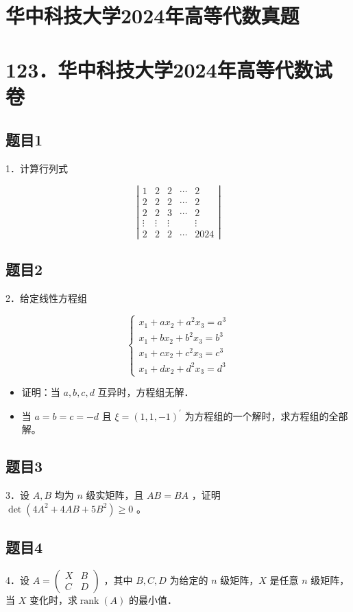 \documentclass{article}
\begin{document}
\section*{华中科技大学2024年高等代数真题}
\section*{123．华中科技大学2024年高等代数试卷}

\subsection{题目1}
1．计算行列式

\[
\left|\begin{array}{ccccc}
1 & 2 & 2 & \cdots & 2 \\
2 & 2 & 2 & \cdots & 2 \\
2 & 2 & 3 & \cdots & 2 \\
\vdots & \vdots & \vdots & & \vdots \\
2 & 2 & 2 & \cdots & 2024
\end{array}\right|
\]

\subsection{题目2}
2．给定线性方程组

\[
\left\{\begin{array}{l}
x_{1}+a x_{2}+a^{2} x_{3}=a^{3} \\
x_{1}+b x_{2}+b^{2} x_{3}=b^{3} \\
x_{1}+c x_{2}+c^{2} x_{3}=c^{3} \\
x_{1}+d x_{2}+d^{2} x_{3}=d^{3}
\end{array}\right.
\]

\begin{itemize}
  \item[（1）] 证明：当 \(a, b, c, d\) 互异时，方程组无解．
  \item[（2）] 当 \(a=b=c=-d\) 且 \(\xi=(1,1,-1)^{\prime}\) 为方程组的一个解时，求方程组的全部解。
\end{itemize}

\subsection{题目3}
3．设 \(A, B\) 均为 \(n\) 级实矩阵，且 \(A B=B A\) ，证明 \(\operatorname{det}\left(4 A^{2}+4 A B+5 B^{2}\right) \geq 0\) 。

\subsection{题目4}
4．设 \(A=\left(\begin{array}{ll}X & B \\ C & D\end{array}\right)\) ，其中 \(B, C, D\) 为给定的 \(n\) 级矩阵，\(X\) 是任意 \(n\) 级矩阵，当 \(X\) 变化时，求\(\operatorname{rank}(A)\) 的最小值．
\end{document}
